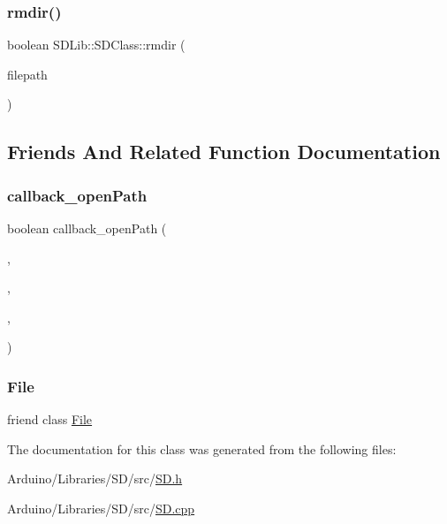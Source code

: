 \subsubsection{\texorpdfstring{rmdir()}{rmdir()}\hspace{0.1cm}{\footnotesize\ttfamily [2/2]}}
{\footnotesize\ttfamily boolean S\+D\+Lib\+::\+S\+D\+Class\+::rmdir (\begin{DoxyParamCaption}\item[{const String \&}]{filepath }\end{DoxyParamCaption})\hspace{0.3cm}{\ttfamily [inline]}}



\subsection{Friends And Related Function Documentation}
\mbox{\label{class_s_d_lib_1_1_s_d_class_a18f78f3da41fcdd7b15eac188c1c1939}} 
\subsubsection{\texorpdfstring{callback\+\_\+open\+Path}{callback\_openPath}}
{\footnotesize\ttfamily boolean callback\+\_\+open\+Path (\begin{DoxyParamCaption}\item[{\hyperlink{class_sd_file}{Sd\+File} \&}]{,  }\item[{const char $\ast$}]{,  }\item[{boolean}]{,  }\item[{void $\ast$}]{ }\end{DoxyParamCaption})\hspace{0.3cm}{\ttfamily [friend]}}

\mbox{\label{class_s_d_lib_1_1_s_d_class_a68d15876ad188b7628261b12d0eac8aa}} 
\subsubsection{\texorpdfstring{File}{File}}
{\footnotesize\ttfamily friend class \hyperlink{class_s_d_lib_1_1_file}{File}\hspace{0.3cm}{\ttfamily [friend]}}



The documentation for this class was generated from the following files\+:\begin{DoxyCompactItemize}
\item 
Arduino/\+Libraries/\+S\+D/src/\hyperlink{_s_d_8h}{S\+D.\+h}\item 
Arduino/\+Libraries/\+S\+D/src/\hyperlink{_s_d_8cpp}{S\+D.\+cpp}\end{DoxyCompactItemize}
